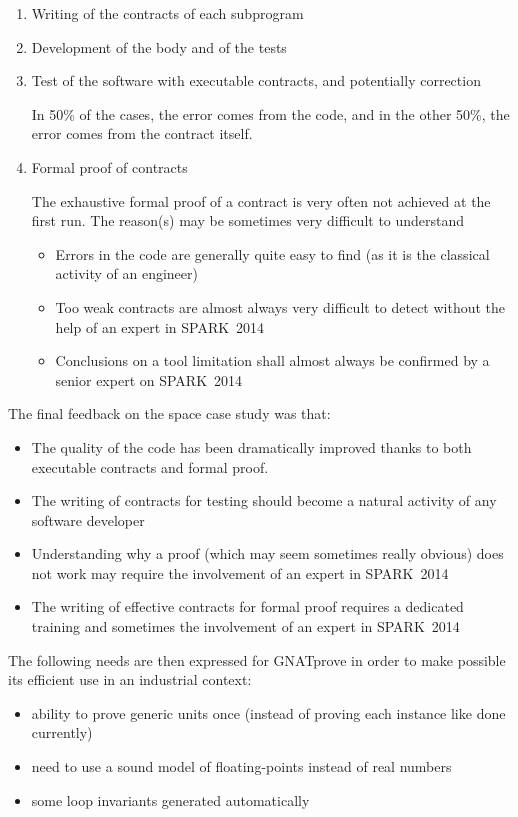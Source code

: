 \documentclass[10pt,a4paper,twocolumn]{article}
\newcommand{\gnatprove}{GNATprove\xspace}
\newcommand{\newspark}{SPARK~2014\xspace}
\begin{document}
\begin{enumerate}
\item Writing of the contracts of each subprogram
\item Development of the body and of the tests
\item Test of the software with executable contracts, and potentially correction

			In 50\% of the cases, the error comes from the code, and in the other
			50\%, the error comes from the contract itself.
\item Formal proof of contracts

			The exhaustive formal proof of a contract is very often not achieved at the first run.
			The reason(s) may be sometimes very difficult to understand
			\begin{itemize}
			\item Errors in the code are generally quite easy to find (as it is
						the classical activity of an engineer)
			\item Too weak contracts are almost always very difficult to detect without
						the help of an expert in \newspark
			\item Conclusions on a tool limitation shall almost always be confirmed by
						a senior expert on \newspark
			\end{itemize}
\end{enumerate}

The final feedback on the space case study was that:
\begin{itemize}
\item The quality of the code has been dramatically improved thanks to both executable contracts and formal proof.
\item The writing of contracts for testing should become a natural activity of any software developer
\item Understanding why a proof (which may seem sometimes really obvious) does not work may require the involvement of an expert in \newspark
\item The writing of effective contracts for formal proof requires a dedicated training and sometimes the involvement of an expert in \newspark
\end{itemize}

The following needs are then expressed for \gnatprove in order to make possible its efficient use in an industrial context:
\begin{itemize}
\item ability to prove generic units once (instead of proving each instance like done currently)
\item need to use a sound model of floating-points instead of real numbers
\item some loop invariants generated automatically
\end{itemize}
\end{document}

